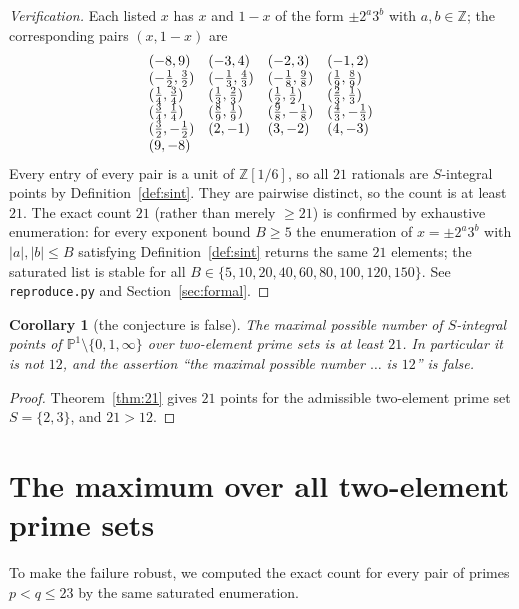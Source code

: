 \documentclass[11pt]{article}
\newtheorem{corollary}[theorem]{Corollary}
\theoremstyle{definition}
\theoremstyle{remark}
\newcommand{\Z}{\mathbb{Z}}
\newcommand{\PP}{\mathbb{P}}
\begin{document}
\begin{proof}[Verification]
Each listed $x$ has $x$ and $1-x$ of the form $\pm 2^{a}3^{b}$ with
$a,b\in\Z$; the corresponding pairs $(x,1-x)$ are
\[
\begin{array}{llll}
(-8,9) & (-3,4) & (-2,3) & (-1,2)\\
(-\tfrac12,\tfrac32) & (-\tfrac13,\tfrac43) & (-\tfrac18,\tfrac98) &
 (\tfrac19,\tfrac89)\\
(\tfrac14,\tfrac34) & (\tfrac13,\tfrac23) & (\tfrac12,\tfrac12) &
 (\tfrac23,\tfrac13)\\
(\tfrac34,\tfrac14) & (\tfrac89,\tfrac19) & (\tfrac98,-\tfrac18) &
 (\tfrac43,-\tfrac13)\\
(\tfrac32,-\tfrac12) & (2,-1) & (3,-2) & (4,-3)\\
\multicolumn{4}{l}{(9,-8)}
\end{array}
\]
Every entry of every pair is a unit of $\Z[1/6]$, so all $21$ rationals are
$S$-integral points by Definition~\ref{def:sint}. They are pairwise distinct,
so the count is at least $21$. The exact count $21$ (rather than merely
$\ge 21$) is confirmed by exhaustive enumeration: for every exponent bound
$B\ge 5$ the enumeration of $x=\pm 2^{a}3^{b}$ with $|a|,|b|\le B$ satisfying
Definition~\ref{def:sint} returns the same $21$ elements; the saturated list is
stable for all $B\in\{5,10,20,40,60,80,100,120,150\}$. See
\texttt{reproduce.py} and Section~\ref{sec:formal}.
\end{proof}

\begin{corollary}[the conjecture is false]\label{cor:false}
The maximal possible number of $S$-integral points of
$\PP^1\setminus\{0,1,\infty\}$ over two-element prime sets is at least $21$.
In particular it is not $12$, and the assertion ``the maximal possible number
$\dots$ is $12$'' is false.
\end{corollary}

\begin{proof}
Theorem~\ref{thm:21} gives $21$ points for the admissible two-element prime set
$S=\{2,3\}$, and $21>12$.
\end{proof}

\section{The maximum over all two-element prime sets}

To make the failure robust, we computed the exact count for every pair of primes
$p<q\le 23$ by the same saturated enumeration.
\end{document}
